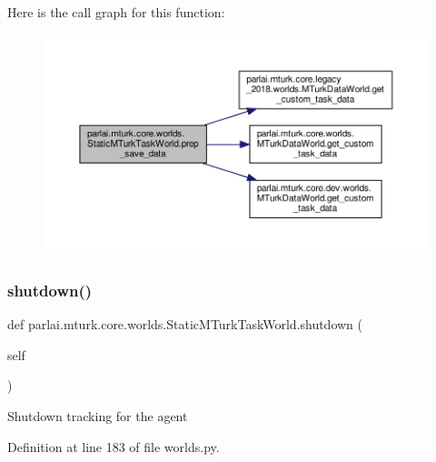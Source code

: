 Here is the call graph for this function\+:
\nopagebreak
\begin{figure}[H]
\begin{center}
\leavevmode
\includegraphics[width=350pt]{classparlai_1_1mturk_1_1core_1_1worlds_1_1StaticMTurkTaskWorld_a38d3d55c327426feb97d42c42c5cb49e_cgraph}
\end{center}
\end{figure}
\mbox{\label{classparlai_1_1mturk_1_1core_1_1worlds_1_1StaticMTurkTaskWorld_a793ecd56172f7bfd540b6d92887fb3f9}} 
\subsubsection{\texorpdfstring{shutdown()}{shutdown()}}
{\footnotesize\ttfamily def parlai.\+mturk.\+core.\+worlds.\+Static\+M\+Turk\+Task\+World.\+shutdown (\begin{DoxyParamCaption}\item[{}]{self }\end{DoxyParamCaption})}

\begin{DoxyVerb}Shutdown tracking for the agent\end{DoxyVerb}
 

Definition at line 183 of file worlds.\+py.



